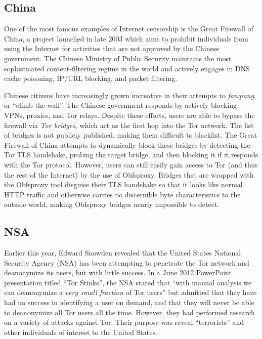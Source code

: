\documentclass[journal]{IEEEtran}
\begin{document}
\subsection{China}

One of the most famous examples of Internet censorship is the Great Firewall of China, a project launched in late 2003 which aims to prohibit individuals from using the Internet for activities that are not approved by the Chinese government. The Chinese Ministry of Public Security maintains the most sophisticated content-filtering regime in the world and actively engages in DNS cache poisoning, IP/URL blocking, and packet filtering.

Chinese citizens have increasingly grown increative in their attempts to \textit{fanqiang}, or ``climb the wall''. The Chinese government responds by actively blocking VPNs, proxies, and Tor relays. Despite these efforts, users are able to bypass the firewall via \textit{Tor bridges}, which act as the first hop into the Tor network. The list of bridges is not publicly published, making them difficult to blacklist. The Great Firewall of China attempts to dynamically block these bridges by detecting the Tor TLS handshake, probing the target bridge, and then blocking it if it responds with the Tor protocol. However, users can still easily gain access to Tor (and thus the rest of the Internet) by the use of Obfsproxy. Bridges that are wrapped with the Obfsproxy tool disguise their TLS handshake so that it looks like normal HTTP traffic and otherwise carries no discernible byte characteristics to the outside world, making Obfsproxy bridges nearly impossible to detect.\cite{Anderson2013}

\subsection{NSA}

Earlier this year, Edward Snowden revealed that the United States National Security Agency (NSA) has been attempting to penetrate the Tor network and deanonymize its users, but with little success. In a June 2012 PowerPoint presentation titled ``Tor Stinks'', the NSA stated that ``with manual analysis we can deanonymize a \textit{very small fraction} of Tor users'' but admitted that they have had no success in identifying a user on demand, and that they will never be able to deanonymize all Tor users all the time. However, they had performed research on a variety of attacks against Tor. Their purpose was reveal ``terrorists'' and other individuals of interest to the United States.
\end{document}
